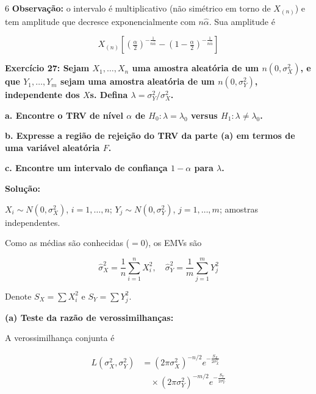\documentclass[8pt, a4paper, landscape]{extarticle}
\begin{document}
\begin{multicols}{6}
\textbf{Observação:} o intervalo é multiplicativo (não simétrico em torno de $X_{(n)}$) e tem amplitude que decresce exponencialmente com $n\hat{\alpha}$. Sua amplitude é

\begin{equation*}
X_{(n)}\left[\left(\tfrac{\alpha}{2}\right)^{-\frac{1}{n\hat{\alpha}}} - \left(1-\tfrac{\alpha}{2}\right)^{-\frac{1}{n\hat{\alpha}}}\right]
\end{equation*}

\vspace{0.4cm}

\textbf{Exercício 27: Sejam $X_1,\dots,X_n$ uma amostra aleatória de um $n(0,\sigma_X^2)$, e que $Y_1,\dots,Y_m$ sejam uma amostra aleatória de um $n(0,\sigma_Y^2)$, independente dos $X$s. Defina $\lambda = \sigma_Y^2/\sigma_X^2$.}

\textbf{a. Encontre o TRV de nível $\alpha$ de $H_0: \lambda = \lambda_0$ versus $H_1: \lambda \neq \lambda_0$.}

\textbf{b. Expresse a região de rejeição do TRV da parte (a) em termos de uma variável aleatória $F$.}

\textbf{c. Encontre um intervalo de confiança $1-\alpha$ para $\lambda$.}

\vspace{0.3cm}

\textbf{Solução:}

$X_i \sim N(0,\sigma_X^2)$, $i=1,\dots,n$; \quad $Y_j \sim N(0,\sigma_Y^2)$, $j=1,\dots,m$; amostras independentes.

Como as médias são conhecidas ($=0$), os EMVs são

\begin{equation*}
\hat{\sigma}_X^2 = \frac{1}{n}\sum_{i=1}^{n} X_i^2, \quad \hat{\sigma}_Y^2 = \frac{1}{m}\sum_{j=1}^{m} Y_j^2
\end{equation*}

Denote $S_X = \sum X_i^2$ e $S_Y = \sum Y_j^2$.

\vspace{0.2cm}

\textbf{(a) Teste da razão de verossimilhanças:}

A verossimilhança conjunta é

\begin{equation*}
\begin{split}
L(\sigma_X^2,\sigma_Y^2) &= (2\pi\sigma_X^2)^{-n/2}e^{-\frac{S_X}{2\sigma_X^2}} \\
&\quad \times (2\pi\sigma_Y^2)^{-m/2}e^{-\frac{S_Y}{2\sigma_Y^2}}
\end{split}
\end{equation*}


\end{multicols}
\end{document}
